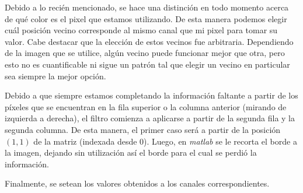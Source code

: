 \par 
Debido a lo recién mencionado, se hace una distinción en todo momento acerca de qué color es el pixel que estamos utilizando. De esta manera podemos elegir cuál posición vecino corresponde al mismo canal que mi pixel para tomar su valor. Cabe destacar que la elección de estos vecinos fue arbitraria. Dependiendo de la imagen que se utilice, algún vecino puede funcionar mejor que otra, pero esto no es cuantificable ni sigue un patrón tal que elegir un vecino en particular sea siempre la mejor opción.
\par 
Debido a que siempre estamos completando la información faltante a partir de los píxeles que se encuentran en la fila superior o la columna anterior (mirando de izquierda a derecha), el filtro comienza a aplicarse a partir de la segunda fila y la segunda columna. De esta manera, el primer caso será a partir de la posición $(1,1)$ de la matriz (indexada desde 0). Luego, en \textit{matlab} se le recorta el borde a la imagen, dejando sin utilización así el borde para el cual se perdió la información.
\par 
Finalmente, se setean los valores obtenidos a los canales correspondientes.




